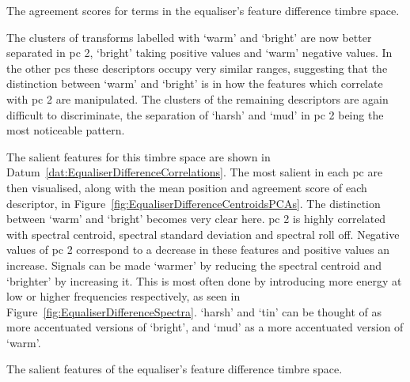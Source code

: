 			\begin{table}[h!]
				\centering
				
				\caption{The agreement scores for terms in the 
					 equaliser's feature difference timbre space.}
				\label{tab:EqualiserDifferenceAgreements}
			\end{table}

			The clusters of transforms labelled with `warm' and `bright' are now better separated in
			\acrshort{pc} 2, `bright' taking positive values and `warm' negative values. In the other
			\acrshort{pc}s these descriptors occupy very similar ranges, suggesting that the distinction
			between `warm' and `bright' is in how the features which correlate with \acrshort{pc} 2 are
			manipulated. The clusters of the remaining descriptors are again difficult to discriminate, the
			separation of `harsh' and `mud' in \acrshort{pc} 2 being the most noticeable pattern.

			The salient features for this timbre space are shown in
			Datum~\ref{dat:EqualiserDifferenceCorrelations}. The most salient in each \acrshort{pc} are then
			visualised, along with the mean position and agreement score of each descriptor, in
			Figure~\ref{fig:EqualiserDifferenceCentroidsPCAs}. The distinction between `warm' and `bright'
			becomes very clear here. \acrshort{pc} 2 is highly correlated with spectral centroid, spectral
			standard deviation and spectral roll off. Negative values of \acrshort{pc} 2 correspond to a
			decrease in these features and positive values an increase. Signals can be made `warmer' by
			reducing the spectral centroid and `brighter' by increasing it. This is most often done by
			introducing more energy at low or higher frequencies respectively, as seen in
			Figure~\ref{fig:EqualiserDifferenceSpectra}. `harsh' and `tin' can be thought of as more
			accentuated versions of `bright', and `mud' as a more accentuated version of `warm'.

			\begin{datum}[h!]
				\centering
				\begin{minipage}{0.9\textwidth}
					
				\end{minipage}
				\caption{The salient features of the equaliser's
					 feature difference timbre space.}
				\label{dat:EqualiserDifferenceCorrelations}
			\end{datum}

